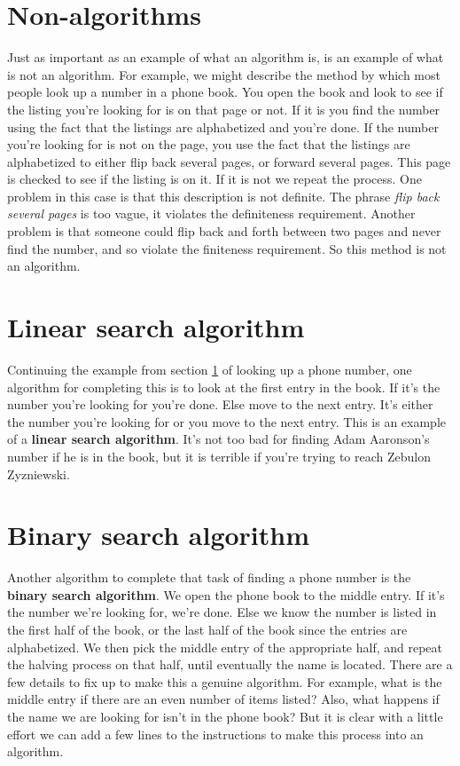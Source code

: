 \section{Non-algorithms}\label{sec:non-algorithms}
Just as important as an example of what an algorithm is, is an example of what is not an algorithm.
For example, we might describe the method by which most people look up a number in a phone book.
You open the book and look to see if the listing you're looking for is on that page or not. If it is
you find the number using the fact that the listings are alphabetized and you're done. If the number
you're looking for is not on the page, you use the fact that the listings are alphabetized to either
flip back several pages, or forward several pages. This page is checked to see if the listing is on it.
If it is not we repeat the process. One problem in this case is that this description is not definite.
The phrase {\itshape flip back several pages} is too vague, it violates the definiteness 
requirement. Another problem is that someone could flip
back and forth between two pages and never find the number, and so violate the finiteness 
requirement. So this method is not an algorithm.

\section{Linear search algorithm}
Continuing the example from section \ref{sec:non-algorithms} of looking up a phone number, one algorithm
for completing this is to look at the first entry in the book. If it's the number you're looking for you're
done. Else move to the next entry. It's either the number you're looking for or you move to the
next entry. This is an example of a {\bfseries linear search algorithm}. It's not too bad
for finding Adam Aaronson's number if he is in the book, but it is terrible if you're trying to reach 
Zebulon Zyzniewski.

\section{Binary search algorithm}
Another algorithm to complete that task of finding a phone number is the {\bfseries binary search algorithm}.
We open the phone book to the middle entry. If it's the number we're looking for, we're done.
Else we know the number is listed in the first half of the book, or the last half of the book since
 the entries are alphabetized. We then pick the middle entry
of the appropriate  half, and repeat the halving process on that half, 
until eventually the name is located.
There are a few details to fix up to make this a genuine algorithm. For example, what is the
middle entry if there are an even number of items listed? Also, what happens if the name
we are looking for isn't in the phone book? But it is clear with a little effort we can add a 
few lines to the instructions to make this process into an algorithm.


